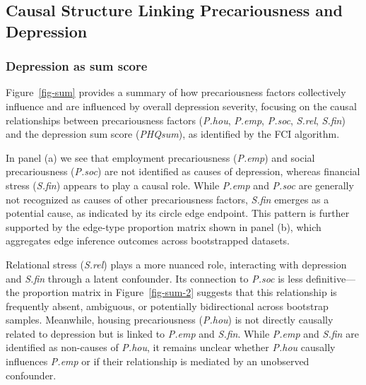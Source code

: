 \documentclass[
]{article}
\begin{document}
\subsection{Causal Structure Linking Precariousness and
Depression}\label{causal-structure-linking-precariousness-and-depression}

\subsubsection{Depression as sum score}\label{depression-as-sum-score}

Figure~\ref{fig-sum} provides a summary of how precariousness factors
collectively influence and are influenced by overall depression
severity, focusing on the causal relationships between precariousness
factors (\emph{P.hou}, \emph{P.emp}, \emph{P.soc}, \emph{S.rel},
\emph{S.fin}) and the depression sum score (\emph{PHQsum}), as
identified by the FCI algorithm.

In panel (a) we see that employment precariousness (\emph{P.emp}) and
social precariousness (\emph{P.soc}) are not identified as causes of
depression, whereas financial stress (\emph{S.fin}) appears to play a
causal role. While \emph{P.emp} and \emph{P.soc} are generally not
recognized as causes of other precariousness factors, \emph{S.fin}
emerges as a potential cause, as indicated by its circle edge endpoint.
This pattern is further supported by the edge-type proportion matrix
shown in panel (b), which aggregates edge inference outcomes across
bootstrapped datasets.

Relational stress (\emph{S.rel}) plays a more nuanced role, interacting
with depression and \emph{S.fin} through a latent confounder. Its
connection to \emph{P.soc} is less definitive---the proportion matrix in
Figure~\ref{fig-sum-2} suggests that this relationship is frequently
absent, ambiguous, or potentially bidirectional across bootstrap
samples. Meanwhile, housing precariousness (\emph{P.hou}) is not
directly causally related to depression but is linked to \emph{P.emp}
and \emph{S.fin}. While \emph{P.emp} and \emph{S.fin} are identified as
non-causes of \emph{P.hou}, it remains unclear whether \emph{P.hou}
causally influences \emph{P.emp} or if their relationship is mediated by
an unobserved confounder.
\end{document}
